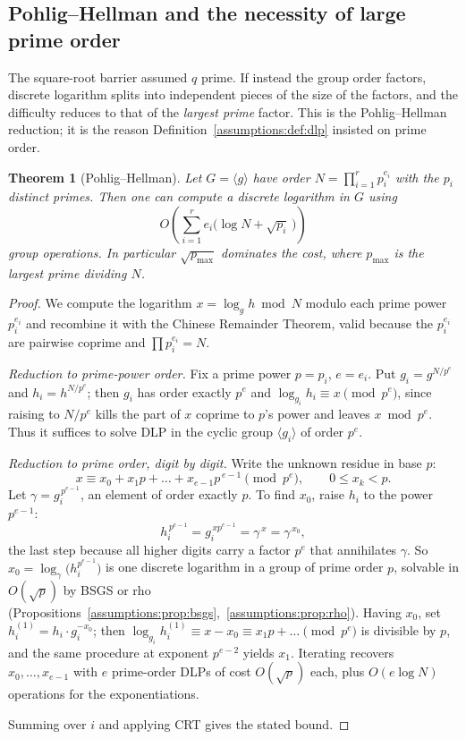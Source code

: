 \documentclass[11pt,a4paper]{article}
\newtheorem{theorem}{Theorem}[section]
\theoremstyle{definition}
\theoremstyle{remark}
\begin{document}
\subsection{Pohlig--Hellman and the necessity of large prime order}
\label{assumptions:subsec:pohlig}

The square-root barrier assumed \(q\) prime. If instead the group order factors, discrete logarithm splits into independent pieces of the size of the factors, and the difficulty reduces to that of the \emph{largest prime} factor. This is the Pohlig--Hellman reduction; it is the reason Definition~\ref{assumptions:def:dlp} insisted on prime order.

\begin{theorem}[Pohlig--Hellman]
\label{assumptions:thm:pohlig}
Let \(G = \langle g\rangle\) have order \(N = \prod_{i=1}^{r} p_i^{e_i}\) with the \(p_i\) distinct primes. Then one can compute a discrete logarithm in \(G\) using
\[
O\!\left(\sum_{i=1}^{r} e_i \bigl(\log N + \sqrt{p_i}\,\bigr)\right)
\]
group operations. In particular \(\sqrt{p_{\max}}\) dominates the cost, where \(p_{\max}\) is the largest prime dividing \(N\).
\end{theorem}

\begin{proof}
We compute the logarithm \(x = \log_g h \bmod N\) modulo each prime power \(p_i^{e_i}\) and recombine it with the Chinese Remainder Theorem, valid because the \(p_i^{e_i}\) are pairwise coprime and \(\prod p_i^{e_i} = N\).

\emph{Reduction to prime-power order.} Fix a prime power \(p = p_i\), \(e = e_i\). Put \(g_i = g^{N/p^{e}}\) and \(h_i = h^{N/p^{e}}\); then \(g_i\) has order exactly \(p^{e}\) and \(\log_{g_i} h_i \equiv x \pmod{p^{e}}\), since raising to \(N/p^e\) kills the part of \(x\) coprime to \(p\)'s power and leaves \(x \bmod p^e\). Thus it suffices to solve DLP in the cyclic group \(\langle g_i\rangle\) of order \(p^{e}\).

\emph{Reduction to prime order, digit by digit.} Write the unknown residue in base \(p\):
\[
x \equiv x_0 + x_1 p + \dots + x_{e-1} p^{\,e-1} \pmod{p^{e}}, \qquad 0 \le x_k < p.
\]
Let \(\gamma = g_i^{\,p^{e-1}}\), an element of order exactly \(p\). To find \(x_0\), raise \(h_i\) to the power \(p^{e-1}\):
\[
h_i^{\,p^{e-1}} = g_i^{\,x p^{e-1}} = \gamma^{\,x} = \gamma^{\,x_0},
\]
the last step because all higher digits carry a factor \(p^{e}\) that annihilates \(\gamma\). So \(x_0 = \log_{\gamma}\bigl(h_i^{p^{e-1}}\bigr)\) is one discrete logarithm in a group of prime order \(p\), solvable in \(O(\sqrt p)\) by BSGS or rho (Propositions~\ref{assumptions:prop:bsgs},~\ref{assumptions:prop:rho}). Having \(x_0\), set \(h_i^{(1)} = h_i \cdot g_i^{-x_0}\); then \(\log_{g_i} h_i^{(1)} \equiv x - x_0 \equiv x_1 p + \dots \pmod{p^e}\) is divisible by \(p\), and the same procedure at exponent \(p^{e-2}\) yields \(x_1\). Iterating recovers \(x_0, \dots, x_{e-1}\) with \(e\) prime-order DLPs of cost \(O(\sqrt p)\) each, plus \(O(e\log N)\) operations for the exponentiations.

Summing over \(i\) and applying CRT gives the stated bound.
\end{proof}
\end{document}
